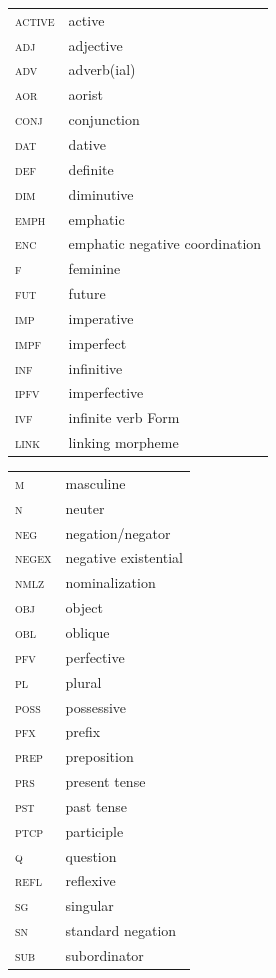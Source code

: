 \documentclass[output=paper,colorlinks=true, citecolor=brown]{langscibook}
\begin{document}
\begin{tabularx}{.45\textwidth}{lQ}
\textsc{active} & active \\
\textsc{adj} & adjective\\
\textsc{adv} & adverb(ial)\\
\textsc{aor} & aorist\\
\textsc{conj} & conjunction\\
\textsc{dat} & dative\\
\textsc{def} & definite\\
\textsc{dim} & diminutive\\
\textsc{emph} & emphatic\\
\textsc{enc} & emphatic negative coordination\\
\textsc{f} & feminine\\
\textsc{fut} & future\\
\textsc{imp} & imperative\\
\textsc{impf} & imperfect\\
\textsc{inf} & infinitive\\
\textsc{ipfv} & imperfective\\
\textsc{ivf} & infinite verb Form\\
\textsc{link} & linking morpheme\\
\end{tabularx}
\quad
\begin{tabularx}{.45\textwidth}{lQ}

\textsc{m} & masculine\\
\textsc{n} & neuter\\
\textsc{neg} & negation\slash negator\\
\textsc{negex} & negative existential\\
\textsc{nmlz} & nominalization\\
\textsc{obj} & object\\
\textsc{obl} & oblique\\
\textsc{pfv} & perfective\\
\textsc{pl} & plural\\
\textsc{poss} & possessive\\
\textsc{pfx} & prefix\\
\textsc{prep} & preposition\\
\textsc{prs} & present tense\\
\textsc{pst} & past tense\\
\textsc{ptcp} & participle\\
\textsc{q} & question\\
\textsc{refl} & reflexive\\
\textsc{sg} & singular\\
\textsc{sn} & standard negation\\
\textsc{sub} & subordinator\\
\end{tabularx}


\printbibliography[heading=subbibliography,notkeyword=this]
\end{document}
